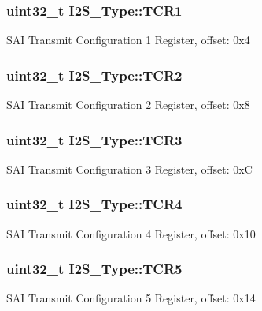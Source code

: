 \subsubsection[{\texorpdfstring{T\+C\+R1}{TCR1}}]{ uint32\+\_\+t I2\+S\+\_\+\+Type\+::\+T\+C\+R1}\hypertarget{structI2S__Type_a402dc49c093c976d36ae655ab62d0df5}{}\label{structI2S__Type_a402dc49c093c976d36ae655ab62d0df5}
S\+AI Transmit Configuration 1 Register, offset\+: 0x4 
\subsubsection[{\texorpdfstring{T\+C\+R2}{TCR2}}]{ uint32\+\_\+t I2\+S\+\_\+\+Type\+::\+T\+C\+R2}\hypertarget{structI2S__Type_a4134a86cc4b66d8d7e59fed43bf833ca}{}\label{structI2S__Type_a4134a86cc4b66d8d7e59fed43bf833ca}
S\+AI Transmit Configuration 2 Register, offset\+: 0x8 
\subsubsection[{\texorpdfstring{T\+C\+R3}{TCR3}}]{ uint32\+\_\+t I2\+S\+\_\+\+Type\+::\+T\+C\+R3}\hypertarget{structI2S__Type_a3a79413b288cefdce2291865b42c6a31}{}\label{structI2S__Type_a3a79413b288cefdce2291865b42c6a31}
S\+AI Transmit Configuration 3 Register, offset\+: 0xC 
\subsubsection[{\texorpdfstring{T\+C\+R4}{TCR4}}]{ uint32\+\_\+t I2\+S\+\_\+\+Type\+::\+T\+C\+R4}\hypertarget{structI2S__Type_ae01402cc631b47ce8128465aa287e6df}{}\label{structI2S__Type_ae01402cc631b47ce8128465aa287e6df}
S\+AI Transmit Configuration 4 Register, offset\+: 0x10 
\subsubsection[{\texorpdfstring{T\+C\+R5}{TCR5}}]{ uint32\+\_\+t I2\+S\+\_\+\+Type\+::\+T\+C\+R5}\hypertarget{structI2S__Type_a91337041fca47b36ff4f31f29cb273bf}{}\label{structI2S__Type_a91337041fca47b36ff4f31f29cb273bf}
S\+AI Transmit Configuration 5 Register, offset\+: 0x14 
